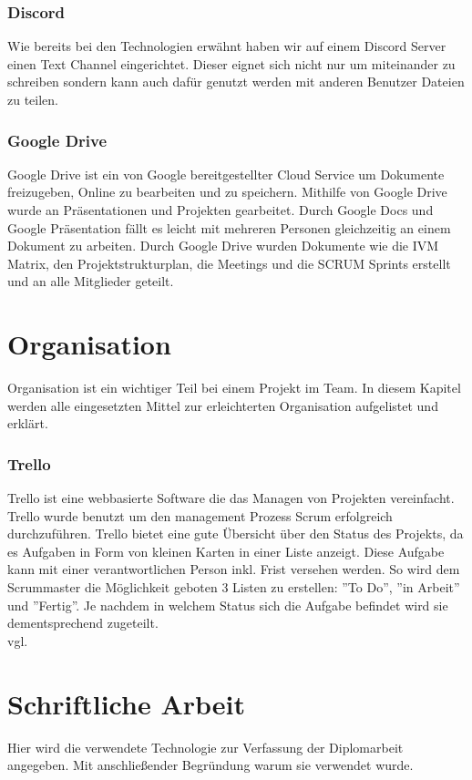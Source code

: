 \subsubsection {Discord}
\label{sec:Discord}
Wie bereits bei den Technologien erwähnt haben wir auf einem Discord Server einen Text Channel eingerichtet. Dieser eignet sich nicht nur um miteinander zu schreiben sondern kann auch dafür genutzt werden mit anderen Benutzer Dateien zu teilen. 
\subsubsection {Google Drive}
\label{sec:GoogleDrive}
Google Drive ist ein von Google bereitgestellter Cloud Service um Dokumente freizugeben, Online zu bearbeiten und zu speichern.
Mithilfe von Google Drive wurde an Präsentationen und Projekten gearbeitet. Durch Google Docs und Google Präsentation fällt es leicht mit mehreren Personen gleichzeitig an einem Dokument zu arbeiten. Durch Google Drive wurden Dokumente wie die IVM Matrix, den Projektstrukturplan, die Meetings und die SCRUM Sprints erstellt und an alle Mitglieder geteilt. 
\section{Organisation}
\label{sec:Organisation}
Organisation ist ein wichtiger Teil bei einem Projekt im Team. In diesem Kapitel werden alle eingesetzten Mittel zur erleichterten Organisation aufgelistet und erklärt.
\subsubsection {Trello}
\label{sec:Trello}
Trello ist eine webbasierte Software die das Managen von Projekten vereinfacht. Trello wurde benutzt um den management Prozess Scrum erfolgreich durchzuführen. Trello bietet eine gute Übersicht über den Status des Projekts, da es Aufgaben in Form von kleinen Karten in einer Liste anzeigt. Diese Aufgabe kann mit einer verantwortlichen Person inkl. Frist versehen werden. So wird dem Scrummaster die Möglichkeit geboten 3 Listen zu erstellen: ''To Do'', ''in Arbeit'' und ''Fertig''. Je nachdem in welchem Status sich die Aufgabe befindet wird sie dementsprechend zugeteilt. \\vgl. \cite{trello} 
\section{Schriftliche Arbeit}
\label{sec:TechSchriftlicheArbeit}
Hier wird die verwendete Technologie zur Verfassung der Diplomarbeit angegeben. Mit anschließender Begründung warum sie verwendet wurde.
